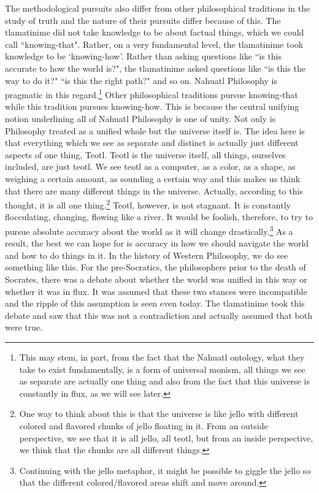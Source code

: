 The methodological pursuits also differ from other philosophical traditions in the study of truth and the nature of their pursuits differ because of this. The tlamatinime did not take knowledge to be about factual things, which we could call ``knowing-that". Rather, on a very fundamental level, the tlamatinime took knowledge to be `knowing-how'. Rather than asking questions like ``is this accurate to how the world is?", the tlamatinime asked questions like ``is this the way to do it?" ``is this the right path?" and so on. Nahuatl Philosophy is pragmatic in this regard.\footnote{This may stem, in part, from the fact that the Nahuatl ontology, what they take to exist fundamentally, is a form of universal monism, all things we see as separate are actually one thing and also from the fact that this universe is constantly in flux, as we will see later.} Other philosophical traditions pursue knowing-that while this tradition pursues knowing-how. This is because the central unifying notion underlining all of Nahuatl Philosophy is one of unity. Not only is Philosophy treated as a unified whole but the universe itself is. The idea here is that everything which we see as separate and distinct is actually just different aspects of one thing, \Gls{Teotl}. Teotl is the universe itself, all things, ourselves included, are just teotl. We see teotl as a computer, as a color, as a shape, as weighing a certain amount, as sounding a certain way and this makes us think that there are many different things in the universe. Actually, according to this thought, it is all one thing.\footnote{One way to think about this is that the universe is like jello with different colored and flavored chunks of jello floating in it. From an outside perspective, we see that it is all jello, all teotl, but from an inside perspective, we think that the chunks are all different things.} Teotl, however, is not stagnant. It is constantly flocculating, changing, flowing like a river. It would be foolish, therefore, to try to pursue absolute accuracy about the world as it will change drastically.\footnote{Continuing with the jello metaphor, it might be possible to giggle the jello so that the different colored/flavored areas shift and move around.} As a result, the best we can hope for is accuracy in how we should navigate the world and how to do things in it. In the history of Western Philosophy, we do see something like this. For the pre-Socratics, the philosophers prior to the death of Socrates, there was a debate about whether the world was unified in this way or whether it was in flux. It was assumed that these two stances were incompatible and the ripple of this assumption is seen even today. The tlamatinime took this debate and saw that this was not a contradiction and actually assumed that both were true. 


